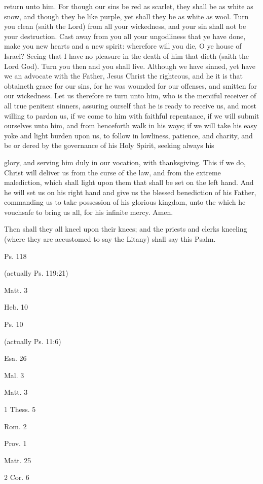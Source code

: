 return unto him. For though our sins be red as scarlet, they shall be as white as snow,
and though they be like purple, yet shall they be as white as wool. Turn you
clean (saith the Lord) from all your wickedness, and your sin shall not be your
destruction. Cast away from you all your ungodliness that ye have done, make
you new hearts and a new spirit: wherefore will you die, O ye house of Israel? Seeing that
I have no pleasure in the death of him that dieth (saith the Lord God). Turn you then and
you shall live. Although we have sinned, yet have we an advocate with the Father, Jesus
Christ the righteous, and he it is that obtaineth grace for our sins, for he was wounded
for our offenses, and smitten for our wickedness. Let us therefore re turn unto
him, who is the merciful receiver of all true penitent sinners, assuring ourself that he
is ready to receive us, and most willing to pardon us, if we come to him with faithful
repentance, if we will submit ourselves unto him, and from henceforth walk in his ways; if
we will take his easy yoke and light burden upon us, to follow in lowliness, patience, and
charity, and be or dered by the governance of his Holy Spirit, seeking always his 

glory, and serving him duly in our vocation, with thanksgiving. This if we do, Christ will
deliver us from the curse of the law, and from the extreme malediction, which shall light
upon them that shall be set on the left hand. And he will set us on his right hand and
give us the blessed benediction of his Father, commanding us to take possession of his
glorious kingdom, unto the which he vouchsafe to bring us all, for his infinite
mercy. Amen.

Then shall they all kneel upon their knees; and the priests and
clerks kneeling (where they are accustomed to say the Litany) shall say this Psalm.

Ps. 118

(actually Ps. 119:21)

Matt. 3

Heb. 10

Ps. 10

(actually Ps. 11:6)

Esa. 26

Mal. 3

Matt. 3

1 Thess. 5

Rom. 2

Prov. 1

Matt. 25

2 Cor. 6

